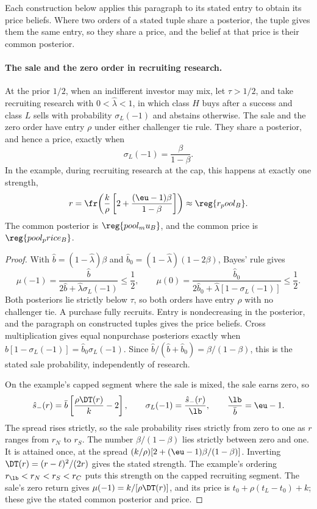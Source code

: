 Each construction below applies this paragraph to its stated entry to obtain its price beliefs. Where two orders
of a stated tuple share a posterior, the tuple gives them the same entry, so they share a price, and the belief at
that price is their common posterior.

\paragraph{The sale and the zero order in recruiting research.}
At the prior \(1/2\), when an indifferent investor may mix, let \(\tau>1/2\), and take recruiting research with \(0<\hat\lambda<1\), in which class
\(H\) buys after a success and class \(L\) sells with probability \(\sigma_L(-1)\) and abstains otherwise.
The sale and the zero order have entry \(\rho\) under either challenger tie rule. They share a posterior,
and hence a price, exactly when
\[
\sigma_L(-1)=\frac{\beta}{1-\beta}.
\]
In the example, during recruiting research at the cap, this happens at exactly one strength,
\[
r=\fr\!\left(\frac{k}{\rho}\left[2+\frac{(\eu-1)\beta}{1-\beta}\right]\right)
\approx\reg{r_pool_B}.
\]
The common posterior is \(\reg{pool_mu_B}\), and the common price is \(\reg{pool_price_B}\).

\begin{proof}
With \(\hat b=(1-\hat\lambda)\beta\) and \(\hat b_0=(1-\hat\lambda)(1-2\beta)\), Bayes' rule gives
\[
\mu(-1)=\frac{\hat b}{2\hat b+\hat\lambda\sigma_L(-1)}\le\frac12,\qquad
\mu(0)=\frac{\hat b_0}{2\hat b_0+\hat\lambda[1-\sigma_L(-1)]}\le\frac12.
\]
Both posteriors lie strictly below \(\tau\), so both orders have entry \(\rho\) with no challenger tie. A purchase
fully recruits. Entry is nondecreasing in the posterior, and the paragraph on constructed tuples gives the
price beliefs. Cross multiplication gives equal nonpurchase posteriors exactly when
\(\hat b[1-\sigma_L(-1)]=\hat b_0\sigma_L(-1)\). Since
\(\hat b/(\hat b+\hat b_0)=\beta/(1-\beta)\), this is the stated sale probability, independently of research.

On the example's capped segment where the sale is mixed, the sale earns zero, so
\[
\hat s_-(r)=\bar b\left[\frac{\rho\DT(r)}{k}-2\right],\qquad
\sigma_L(-1)=\frac{\hat s_-(r)}{\lb},\qquad
\frac{\lb}{\bar b}=\eu-1.
\]
The spread rises strictly, so the sale probability rises strictly from zero to one as \(r\) ranges from
\(r_N\) to \(r_S\). The number \(\beta/(1-\beta)\) lies strictly between zero and one. It is attained once,
at the spread \((k/\rho)[2+(\eu-1)\beta/(1-\beta)]\). Inverting
\(\DT(r)=(r-\ell)^2/(2r)\) gives the stated strength. The example's ordering
\(r_{\lb}<r_N<r_S<r_C\) puts this strength on the capped recruiting segment.
The sale's zero return gives \(\mu(-1)=k/[\rho\DT(r)]\), and its price is
\(t_0+\rho(t_L-t_0)+k\); these give the stated common posterior and price.
\end{proof}
